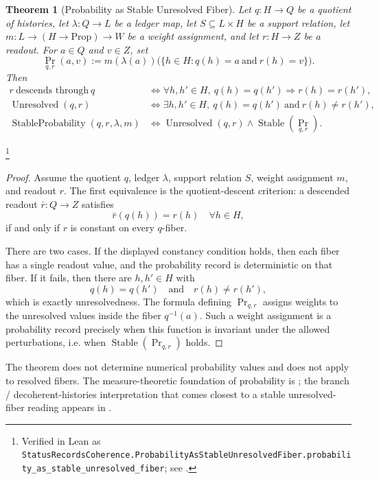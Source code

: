 \documentclass[11pt]{article}
\newtheorem{theorem}{Theorem}[section]
\theoremstyle{definition}
\begin{document}
\begin{theorem}[Probability as Stable Unresolved Fiber]\label{thm:F23}
Let \(q:H\to Q\) be a quotient of histories, let
\(\lambda:Q\to L\) be a ledger map, let
\(S\subseteq L\times H\) be a support relation, let
\(m:L\to (H\to\mathrm{Prop})\to W\) be a weight assignment, and let
\(r:H\to Z\) be a readout.  For \(a\in Q\) and \(v\in Z\), set
\[
  \operatorname{Pr}_{q,r}(a,v)
  :=
  m(\lambda(a))\bigl(\{h\in H:q(h)=a\ \text{and}\ r(h)=v\}\bigr).
\]
Then
\begin{align*}
  r\ \text{descends through}\ q
  &\iff
  \forall h,h'\in H,\ q(h)=q(h')\Rightarrow r(h)=r(h'),\\
  \operatorname{Unresolved}(q,r)
  &\iff
  \exists h,h'\in H,\ q(h)=q(h')\ \text{and}\ r(h)\ne r(h'),\\
  \operatorname{StableProbability}(q,r,\lambda,m)
  &\iff
  \operatorname{Unresolved}(q,r)
  \wedge
  \operatorname{Stable}(\operatorname{Pr}_{q,r}).
\end{align*}
\end{theorem}
\footnote{\raggedright Verified in Lean as
\texttt{StatusRecordsCoherence.\allowbreak{}ProbabilityAsStable\allowbreak{}UnresolvedFiber.\allowbreak{}probability\_as\_stable\_\allowbreak{}unresolved\_fiber};
see .}
\begin{proof}
Assume the quotient \(q\), ledger \(\lambda\), support relation
\(S\), weight assignment \(m\), and readout \(r\).  The first
equivalence is the quotient-descent criterion: a descended readout
\(\bar r:Q\to Z\) satisfies
\[
  \bar r(q(h))=r(h)\quad \forall h\in H,
\]
if and only if \(r\) is constant on every \(q\)-fiber.

There are two cases.  If the displayed constancy condition holds,
then each fiber has a single readout value, and the probability
record is deterministic on that fiber.  If it fails, then there are
\(h,h'\in H\) with
\[
  q(h)=q(h')\quad\text{and}\quad r(h)\ne r(h'),
\]
which is exactly unresolvedness.  The formula defining
\(\operatorname{Pr}_{q,r}\) assigns weights to the unresolved values
inside the fiber \(q^{-1}(a)\).  Such a weight assignment is a
probability record precisely when this function is invariant under
the allowed perturbations, i.e. when
\(\operatorname{Stable}(\operatorname{Pr}_{q,r})\) holds.
\end{proof}

The theorem does not determine numerical probability values and does
not apply to resolved fibers.  The measure-theoretic foundation of
probability is \citet{Kolmogorov1933Grundbegriffe}; the branch /
decoherent-histories interpretation that comes closest to a stable
unresolved-fiber reading appears in \citet{Griffiths1984ConsistentHistories}.
\end{document}
